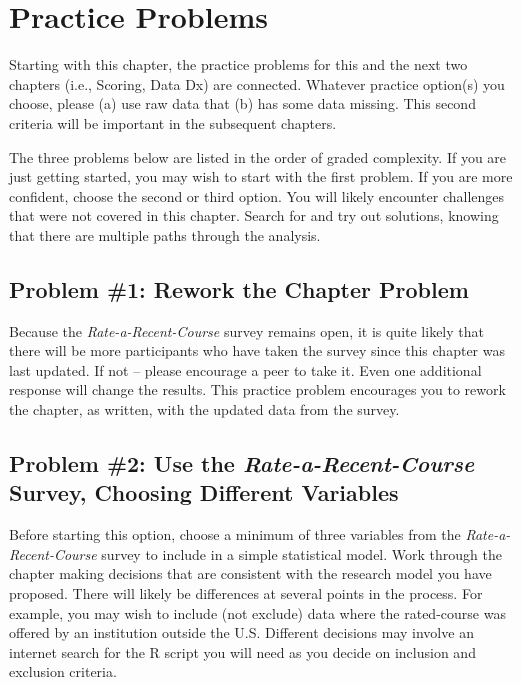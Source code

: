 \documentclass[
  11pt,
]{book}
\begin{document}
\hypertarget{practice-problems}{%
\section{Practice Problems}\label{practice-problems}}

Starting with this chapter, the practice problems for this and the next two chapters (i.e., Scoring, Data Dx) are connected. Whatever practice option(s) you choose, please (a) use raw data that (b) has some data missing. This second criteria will be important in the subsequent chapters.

The three problems below are listed in the order of graded complexity. If you are just getting started, you may wish to start with the first problem. If you are more confident, choose the second or third option. You will likely encounter challenges that were not covered in this chapter. Search for and try out solutions, knowing that there are multiple paths through the analysis.

\hypertarget{problem-1-rework-the-chapter-problem}{%
\subsection{Problem \#1: Rework the Chapter Problem}\label{problem-1-rework-the-chapter-problem}}

Because the \emph{Rate-a-Recent-Course} survey remains open, it is quite likely that there will be more participants who have taken the survey since this chapter was last updated. If not -- please encourage a peer to take it. Even one additional response will change the results. This practice problem encourages you to rework the chapter, as written, with the updated data from the survey.

\hypertarget{problem-2-use-the-rate-a-recent-course-survey-choosing-different-variables}{%
\subsection{\texorpdfstring{Problem \#2: Use the \emph{Rate-a-Recent-Course} Survey, Choosing Different Variables}{Problem \#2: Use the Rate-a-Recent-Course Survey, Choosing Different Variables}}\label{problem-2-use-the-rate-a-recent-course-survey-choosing-different-variables}}

Before starting this option, choose a minimum of three variables from the \emph{Rate-a-Recent-Course} survey to include in a simple statistical model. Work through the chapter making decisions that are consistent with the research model you have proposed. There will likely be differences at several points in the process. For example, you may wish to include (not exclude) data where the rated-course was offered by an institution outside the U.S. Different decisions may involve an internet search for the R script you will need as you decide on inclusion and exclusion criteria.
\end{document}
